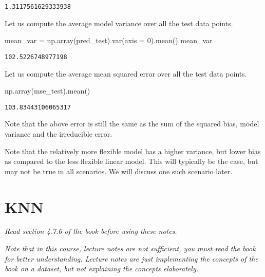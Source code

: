 \documentclass[
  letterpaper,
  DIV=11,
  numbers=noendperiod]{scrreprt}
\newenvironment{Shaded}{\begin{snugshade}}{\end{snugshade}}
\newcommand{\DecValTok}[1]{\textcolor[rgb]{0.68,0.00,0.00}{#1}}
\newcommand{\NormalTok}[1]{\textcolor[rgb]{0.00,0.23,0.31}{#1}}
\newcommand{\OperatorTok}[1]{\textcolor[rgb]{0.37,0.37,0.37}{#1}}
\begin{document}
\begin{verbatim}
1.3117561629333938
\end{verbatim}

Let us compute the average model variance over all the test data points.

\begin{Shaded}
\begin{Highlighting}[]
\NormalTok{mean\_var }\OperatorTok{=}\NormalTok{ np.array(pred\_test).var(axis }\OperatorTok{=} \DecValTok{0}\NormalTok{).mean()}
\NormalTok{mean\_var}
\end{Highlighting}
\end{Shaded}

\begin{verbatim}
102.5226748977198
\end{verbatim}

Let us compute the average mean squared error over all the test data
points.

\begin{Shaded}
\begin{Highlighting}[]
\NormalTok{np.array(mse\_test).mean()}
\end{Highlighting}
\end{Shaded}

\begin{verbatim}
103.83443106065317
\end{verbatim}

Note that the above error is still the same as the sum of the squared
bias, model variance and the irreducible error.

Note that the relatively more flexible model has a higher variance, but
lower bias as compared to the less flexible linear model. This will
typically be the case, but may not be true in all scenarios. We will
discuss one such scenario later.

\chapter{KNN}\label{knn}

\emph{Read section 4.7.6 of the book before using these notes.}

\emph{Note that in this course, lecture notes are not sufficient, you
must read the book for better understanding. Lecture notes are just
implementing the concepts of the book on a dataset, but not explaining
the concepts elaborately.}
\end{document}
